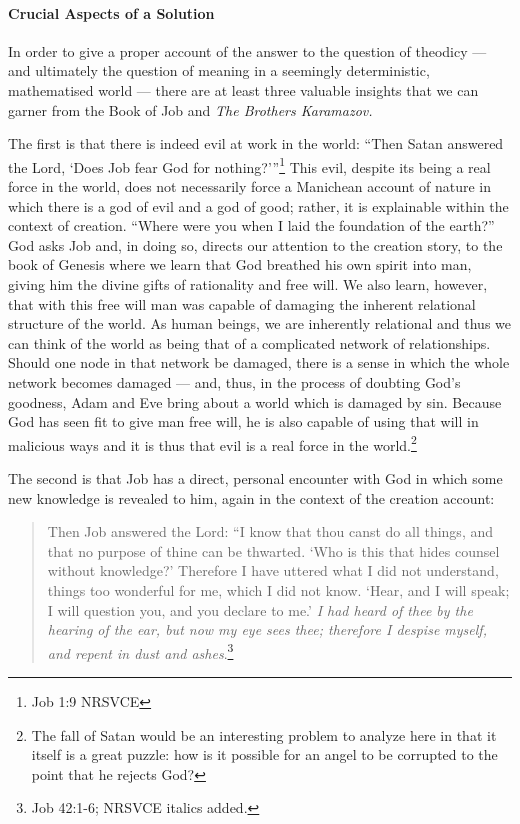 \documentclass[12pt]{article}
\begin{document}
	\paragraph*{Crucial Aspects of a Solution} In order to give a proper account of the answer to the question of theodicy --- and ultimately the question of meaning in a seemingly deterministic, mathematised world --- there are at least three valuable insights that we can garner from the Book of Job and \emph{The Brothers Karamazov.} 
	
	The first is that there is indeed evil at work in the world: ``Then Satan answered the Lord, `Does Job fear God for nothing?'\thinspace''\footnote{Job 1:9 NRSVCE} This evil, despite its being a real force in the world, does not necessarily force a Manichean account of nature in which there is a god of evil and a god of good; rather, it is explainable within the context of creation. ``Where were you when I laid the foundation of the earth?'' God asks Job and, in doing so, directs our attention to the creation story, to the book of Genesis where we learn that God breathed his own spirit into man, giving him the divine gifts of rationality and free will. We also learn, however, that with this free will man was capable of damaging the inherent relational structure of the world. As human beings, we are inherently relational and thus we can think of the world as being that of a complicated network of relationships. Should one node in that network be damaged, there is a sense in which the whole network becomes damaged --- and, thus, in the process of doubting God's goodness, Adam and Eve bring about a world which is damaged by sin. Because God has seen fit to give man free will, he is also capable of using that will in malicious ways and it is thus that evil is a real force in the world.\footnote{The fall of Satan would be an interesting problem to analyze here in that it itself is a great puzzle: how is it possible for an angel to be corrupted to the point that he rejects God?}  
	
	The second is that Job has a direct, personal encounter with God in which some new knowledge is revealed to him, again in the context of the creation account:
	
	\begin{quote}
	\singlespacing
	\footnotesize
Then Job answered the Lord: ``I know that thou canst do all things, and that no purpose of thine can be thwarted. `Who is this that hides counsel without knowledge?' Therefore I have uttered what I did not understand, things too wonderful for me, which I did not know. `Hear, and I will speak; I will question you, and you declare to me.' \emph{I had heard of thee by the hearing of the ear, but now my eye sees thee; therefore I despise myself, and repent in dust and ashes}.\footnote{Job 42:1-6; NRSVCE italics added.} 
\end{quote} 
\end{document}
